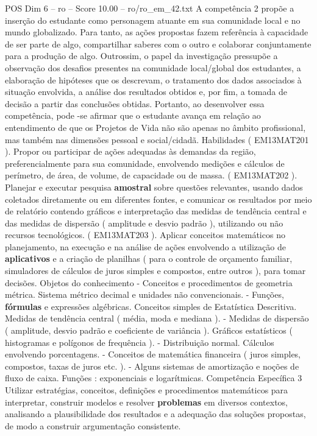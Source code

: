 \begin{textsample}{POS Dim 6 – ro – Score 10.00 – ro/ro\_em\_42.txt}
A competência 2 propõe a inserção do estudante como personagem atuante em sua comunidade local e no mundo globalizado.
Para tanto, as ações propostas fazem referência à capacidade de ser parte de algo, compartilhar saberes com o outro e colaborar conjuntamente para a produção de algo.
Outrossim, o papel da investigação pressupõe a observação dos desafios presentes na comunidade local/global dos estudantes, a elaboração de hipóteses que os descrevam, o tratamento dos dados associados à situação envolvida, a análise dos resultados obtidos e, por fim, a tomada de decisão a partir das conclusões obtidas.
Portanto, ao desenvolver essa competência, pode -se afirmar que o estudante avança em relação ao entendimento de que os Projetos de Vida não são apenas no âmbito profissional, mas também nas dimensões pessoal e social/cidadã.
Habilidades ( EM13MAT201 ).
Propor ou participar de ações adequadas às demandas da região, preferencialmente para sua comunidade, envolvendo medições e cálculos de perímetro, de área, de volume, de capacidade ou de massa. ( EM13MAT202 ).
Planejar e executar pesquisa \textbf{amostral} sobre questões relevantes, usando dados coletados diretamente ou em diferentes fontes, e comunicar os resultados por meio de relatório contendo gráficos e interpretação das medidas de tendência central e das medidas de dispersão ( amplitude e desvio padrão ), utilizando ou não recursos tecnológicos. ( EM13MAT203 ).
Aplicar conceitos matemáticos no planejamento, na execução e na análise de ações envolvendo a utilização de \textbf{aplicativos} e a criação de planilhas ( para o controle de orçamento familiar, simuladores de cálculos de juros simples e compostos, entre outros ), para tomar decisões.
Objetos do conhecimento - Conceitos e procedimentos de geometria métrica.
Sistema métrico decimal e unidades não convencionais. - Funções, \textbf{fórmulas} e expressões algébricas.
Conceitos simples de Estatística Descritiva.
Medidas de tendência central ( média, moda e mediana ). - Medidas de dispersão ( amplitude, desvio padrão e coeficiente de variância ).
Gráficos estatísticos ( histogramas e polígonos de frequência ). - Distribuição normal.
Cálculos envolvendo porcentagens. - Conceitos de matemática financeira ( juros simples, compostos, taxas de juros etc. ). - Alguns sistemas de amortização e noções de fluxo de caixa.
Funções : exponenciais e logarítmicas.
Competência Específica 3 Utilizar estratégias, conceitos, definições e procedimentos matemáticos para interpretar, construir modelos e resolver \textbf{problemas} em diversos contextos, analisando a plausibilidade dos resultados e a adequação das soluções propostas, de modo a construir argumentação consistente.

\end{textsample}
